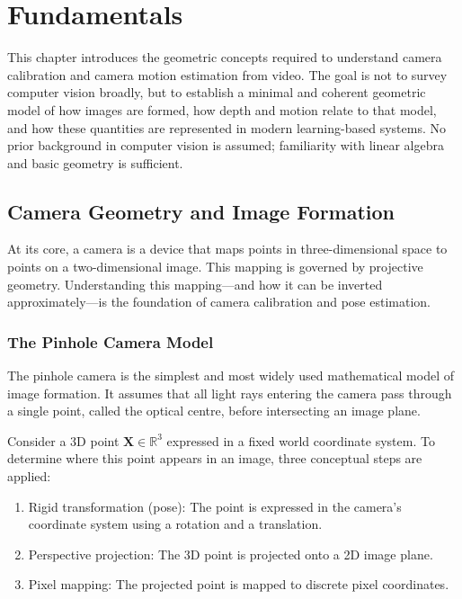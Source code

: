 
\chapter{Fundamentals}\label{chapter:fundamentals}

This chapter introduces the geometric concepts required to understand camera calibration and camera motion estimation from video. The goal is not to survey computer vision broadly, but to establish a minimal and coherent geometric model of how images are formed, how depth and motion relate to that model, and how these quantities are represented in modern learning-based systems. No prior background in computer vision is assumed; familiarity with linear algebra and basic geometry is sufficient.

\section{Camera Geometry and Image Formation}
At its core, a camera is a device that maps points in three-dimensional space to points on a two-dimensional image. This mapping is governed by projective geometry. Understanding this mapping---and how it can be inverted approximately---is the foundation of camera calibration and pose estimation.

\subsection{The Pinhole Camera Model}
The pinhole camera is the simplest and most widely used mathematical model of image formation. It assumes that all light rays entering the camera pass through a single point, called the optical centre, before intersecting an image plane.

Consider a 3D point $\mathbf{X} \in \mathbb{R}^3$ expressed in a fixed world coordinate system. To determine where this point appears in an image, three conceptual steps are applied:

\begin{enumerate}
    \item Rigid transformation (pose): The point is expressed in the camera’s coordinate system using a rotation and a translation.
    \item Perspective projection: The 3D point is projected onto a 2D image plane.
    \item Pixel mapping: The projected point is mapped to discrete pixel coordinates.
\end{enumerate}


